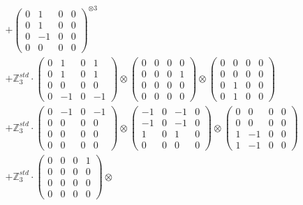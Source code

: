 \documentclass{article}
\begin{document}
{\begin{align}
        &+ \label{Rs16-Rc11-Solution-17-c16} \begin{pmatrix} 0 & 1 & 0 & 0 \\ 0 & 1 & 0 & 0 \\ 0 & -1 & 0 & 0 \\ 0 & 0 & 0 & 0 \end{pmatrix}^{\otimes 3} \\
        &+ \label{Rs16-Rc11-Solution-17-c17} \mathbb{Z}_3^{std} \cdot 
            \begin{pmatrix} 0 & 1 & 0 & 1 \\ 0 & 1 & 0 & 1 \\ 0 & 0 & 0 & 0 \\ 0 & -1 & 0 & -1 \end{pmatrix} \otimes 
            \begin{pmatrix} 0 & 0 & 0 & 0 \\ 0 & 0 & 0 & 1 \\ 0 & 0 & 0 & 0 \\ 0 & 0 & 0 & 0 \end{pmatrix} \otimes 
            \begin{pmatrix} 0 & 0 & 0 & 0 \\ 0 & 0 & 0 & 0 \\ 0 & 1 & 0 & 0 \\ 0 & 1 & 0 & 0 \end{pmatrix} \\ 
        &+ \label{Rs16-Rc11-Solution-17-c18} \mathbb{Z}_3^{std} \cdot 
            \begin{pmatrix} 0 & -1 & 0 & -1 \\ 0 & 0 & 0 & 0 \\ 0 & 0 & 0 & 0 \\ 0 & 0 & 0 & 0 \end{pmatrix} \otimes 
            \begin{pmatrix} -1 & 0 & -1 & 0 \\ -1 & 0 & -1 & 0 \\ 1 & 0 & 1 & 0 \\ 0 & 0 & 0 & 0 \end{pmatrix} \otimes 
            \begin{pmatrix} 0 & 0 & 0 & 0 \\ 0 & 0 & 0 & 0 \\ 1 & -1 & 0 & 0 \\ 1 & -1 & 0 & 0 \end{pmatrix} \\ 
        &+ \label{Rs16-Rc11-Solution-17-c19} \mathbb{Z}_3^{std} \cdot 
            \begin{pmatrix} 0 & 0 & 0 & 1 \\ 0 & 0 & 0 & 0 \\ 0 & 0 & 0 & 0 \\ 0 & 0 & 0 & 0 \end{pmatrix} \otimes 

\end{align}}
\end{document}
